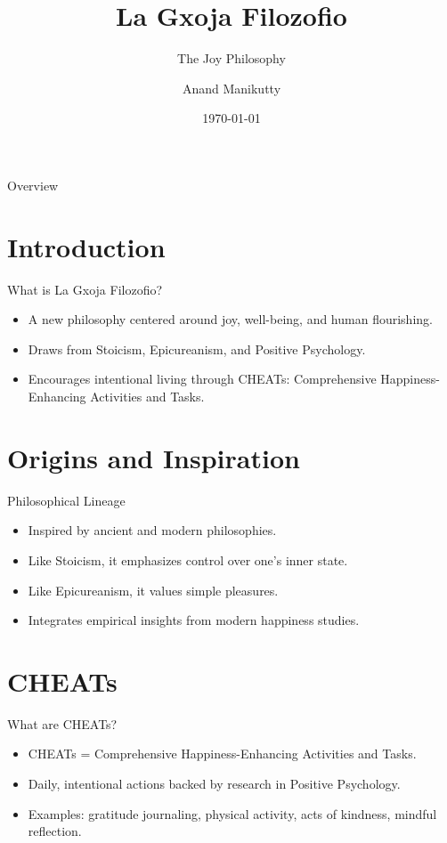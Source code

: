 \documentclass{beamer}
\title{La Gxoja Filozofio}
\subtitle{The Joy Philosophy}
\author{Anand Manikutty}
\date{\today}
\begin{document}
\frame{\titlepage}

\begin{frame}{Overview}
\tableofcontents
\end{frame}

\section{Introduction}
\begin{frame}{What is La Gxoja Filozofio?}
\begin{itemize}
    \item A new philosophy centered around joy, well-being, and human flourishing.
    \item Draws from Stoicism, Epicureanism, and Positive Psychology.
    \item Encourages intentional living through CHEATs: Comprehensive Happiness-Enhancing Activities and Tasks.
\end{itemize}
\end{frame}

\section{Origins and Inspiration}
\begin{frame}{Philosophical Lineage}
\begin{itemize}
    \item Inspired by ancient and modern philosophies.
    \item Like Stoicism, it emphasizes control over one’s inner state.
    \item Like Epicureanism, it values simple pleasures.
    \item Integrates empirical insights from modern happiness studies.
\end{itemize}
\end{frame}

\section{CHEATs}
\begin{frame}{What are CHEATs?}
\begin{itemize}
    \item CHEATs = Comprehensive Happiness-Enhancing Activities and Tasks.
    \item Daily, intentional actions backed by research in Positive Psychology.
    \item Examples: gratitude journaling, physical activity, acts of kindness, mindful reflection.
\end{itemize}
\end{frame}
\end{document}

